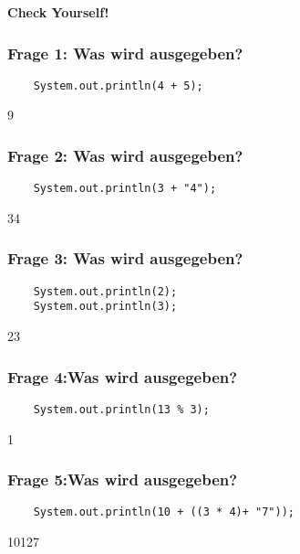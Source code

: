 \documentclass{../../presentation}
\begin{document}
\begin{frame}[plain]
  \centering
  {\Huge\bfseries{Check Yourself!}}
\end{frame}

\begin{frame}[fragile]
  \frametitle{Frage 1: Was wird ausgegeben?}
  \begin{verbatim}
    System.out.println(4 + 5);
  \end{verbatim}
  \pause
  \begin{ausgabe}
    9
  \end{ausgabe}
\end{frame}

\begin{frame}[fragile]
  \frametitle{Frage 2: Was wird ausgegeben?}
  \begin{verbatim}
    System.out.println(3 + "4");
  \end{verbatim}
  \pause
  \begin{ausgabe}
    34
  \end{ausgabe}
\end{frame}

\begin{frame}[fragile]
  \frametitle{Frage 3: Was wird ausgegeben?}
  \begin{verbatim}
    System.out.println(2);
    System.out.println(3);
  \end{verbatim}
  \pause
  \begin{ausgabe}
    23
  \end{ausgabe}
\end{frame}

\begin{frame}[fragile]
  \frametitle{Frage 4:Was wird ausgegeben?}
  \begin{verbatim}
    System.out.println(13 % 3);
  \end{verbatim}
  \pause
  \begin{ausgabe}
    1
  \end{ausgabe}
\end{frame}

\begin{frame}[fragile]
  \frametitle{Frage 5:Was wird ausgegeben?}
  \begin{verbatim}
    System.out.println(10 + ((3 * 4)+ "7"));
  \end{verbatim}
  \pause
  \begin{ausgabe}
    10127
  \end{ausgabe}
\end{frame}
\end{document}
